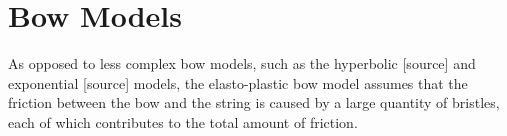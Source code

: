 \section{Bow Models}\label{sec:bowModels}
As opposed to less complex bow models, such as the hyperbolic [source] and exponential [source] models, the elasto-plastic bow model assumes that the friction between the bow and the string is caused by a large quantity of bristles, each of which contributes to the total amount of friction.